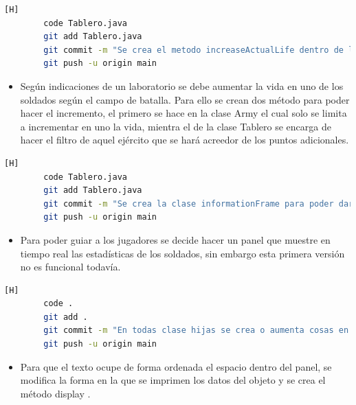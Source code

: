 \documentclass{article}
\begin{document}
	
	

	
	
	\begin{lstlisting}[language=bash,caption={Commit: 60918b188c5e10cdbbd6a472afc8566e4e81809d }][H]
		code Tablero.java
		git add Tablero.java
		git commit -m "Se crea el metodo increaseActualLife dentro de la clase Tablero"			
		git push -u origin main
	\end{lstlisting}
	
	
	\begin{itemize}
		\item Según indicaciones de un laboratorio se debe aumentar la vida en uno de los soldados según el campo de batalla. Para ello se crean dos método para poder hacer el incremento, el primero se hace en la clase Army el cual solo se limita a incrementar en uno la vida, mientra el de la clase Tablero se encarga de hacer el filtro de aquel ejército que se hará acreedor de los puntos adicionales. 
	\end{itemize}
	
	
	
	

	\begin{lstlisting}[language=bash,caption={Commit: 7cc884fd2bbcc1e6c3621af503bf8bb82c9f1c10 }][H]
		code Tablero.java
		git add Tablero.java
		git commit -m "Se crea la clase informationFrame para poder dar a conocer al jugador sobre las estadisticas de batlla, esta es la primera version"			
		git push -u origin main
	\end{lstlisting}
	
	
	\begin{itemize}
		\item Para poder guiar a los jugadores se decide hacer un panel que muestre en tiempo real las estadísticas de los soldados, sin embargo esta primera versión no es funcional todavía. 
	\end{itemize}
	
	
	
	
		\begin{lstlisting}[language=bash,caption={Commit: d97f98a464bcbfa84a41475f9c93c0a7e9f256d8 }][H]
		code .
		git add .
		git commit -m "En todas clase hijas se crea o aumenta cosas en el metodo display"			
		git push -u origin main
	\end{lstlisting}
	
	
	\begin{itemize}
		\item Para que el texto ocupe de forma ordenada el espacio dentro del panel, se modifica la forma en la que se imprimen los datos del objeto y se crea el método display . 
	\end{itemize}
	
\end{document}
